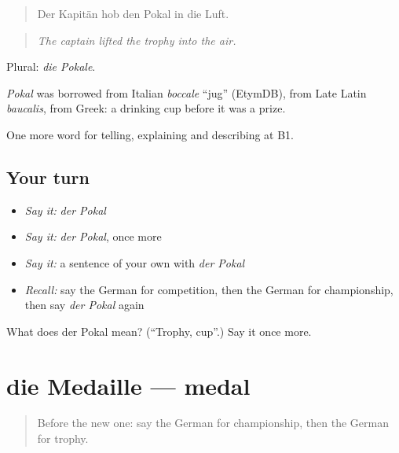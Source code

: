 \begin{quote}
Der Kapitän hob den Pokal in die Luft.
\end{quote}

\begin{quote}
\emph{The captain lifted the trophy into the air.}
\end{quote}

Plural: \emph{die Pokale}.

\begin{cousinweb}
\emph{Pokal} was borrowed from Italian \emph{boccale} \textquotedblleft{}jug\textquotedblright{} (EtymDB), from Late Latin \emph{baucalis}, from Greek: a drinking cup before it was a prize.
\end{cousinweb}

\begin{grammarlens}[title={What you've built}]
One more word for telling, explaining and describing at B1.
\end{grammarlens}

\subsection*{Your turn}
\begin{itemize}
\raggedright
  \item \emph{Say it:} \emph{der Pokal}
  \item \emph{Say it:} \emph{der Pokal}, once more
  \item \emph{Say it:} a sentence of your own with \emph{der Pokal}
  \item \emph{Recall:} say the German for competition, then the German for championship, then say \emph{der Pokal} again
\end{itemize}

\begin{tcolorbox}[breakable,colback=teal!4,colframe=teal!35!black,title={Before you move on}]
What does der Pokal mean? (\textquotedblleft{}Trophy, cup\textquotedblright{}.) Say it once more.
\end{tcolorbox}
\section[die Medaille]{die Medaille — medal}

\label{lesson:GE-C509-medaille}



\begin{quote}
Before the new one: say the German for championship, then the German for trophy.
\end{quote}

